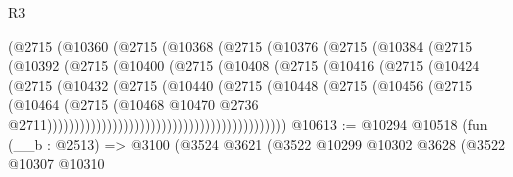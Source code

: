 \begin{lexlean}{R3}
\begin{coremodule}
                                (@2715
                                  (@10360
                                    (@2715
                                      (@10368
                                        (@2715
                                          (@10376
                                            (@2715
                                              (@10384
                                                (@2715
                                                  (@10392
                                                    (@2715
                                                      (@10400
                                                        (@2715
                                                          (@10408
                                                            (@2715
                                                              (@10416
                                                                (@2715
                                                                  (@10424
                                                                    (@2715
                                                                      (@10432
                                                                        (@2715
                                                                          (@10440
                                                                            (@2715
                                                                              (@10448
                                                                                (@2715
                                                                                  (@10456
                                                                                    (@2715
                                                                                      (@10464
                                                                                        (@2715
                                                                                          (@10468
                                                                                            @10470
                                                                                            @2736
                                                                                            @2711))))))))))))))))))))))))))))))))))))))))))))
@10613 := @10294
    @10518
    (fun (__b : @2513) =>
    @3100
      (@3524
        @3621
        (@3522
          @10299
          @10302
          @3628
          (@3522
            @10307
            @10310

\end{coremodule}
\end{lexlean}
